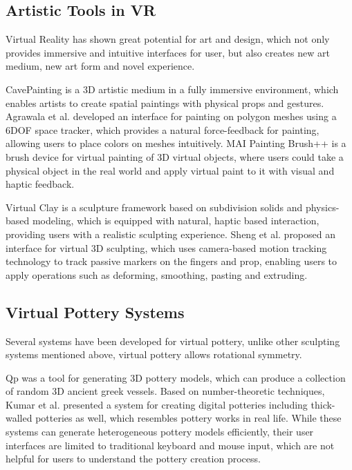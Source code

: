 \subsection{Artistic Tools in VR}
\label{sec:2.2}
Virtual Reality has shown great potential for art and design, which not only provides immersive and intuitive interfaces for user, but also creates new art medium, new art form and novel experience\cite{laviola20113d}.

CavePainting \cite{keefe2001cavepainting} is a 3D artistic medium in a fully immersive environment, which enables artists to create spatial paintings with physical props and gestures. Agrawala et al.\cite{agrawala19953d} developed an interface for painting on polygon meshes using a 6DOF space tracker, which provides a natural force-feedback for painting, allowing users to place colors on meshes intuitively. MAI Painting Brush++ \cite{otsuki2017brush} is a brush device for virtual painting of 3D virtual objects, where users could take a physical object in the real world and apply virtual paint to it with visual and haptic feedback.

Virtual Clay \cite{mcdonnell2001virtual} is a sculpture framework based on subdivision solids and physics-based modeling, which is equipped with natural, haptic based interaction, providing users with a realistic sculpting experience. Sheng et al. \cite{sheng2006interface} proposed an interface for virtual 3D sculpting, which uses camera-based motion tracking technology to track passive markers on the fingers and prop, enabling users to apply operations such as deforming, smoothing, pasting and extruding.

\subsection{Virtual Pottery Systems}
\label{sec:2.3}


Several systems have been developed for virtual pottery, unlike other sculpting systems mentioned above, virtual pottery allows rotational symmetry.

Qp \cite{koutsoudis2009qp} was a tool for generating 3D pottery models, which can produce a collection of random 3D ancient greek vessels.
Based on number-theoretic techniques, Kumar et al. \cite{kumar2011wheel} presented a system for creating digital potteries including thick-walled potteries as well, which resembles pottery works in real life.
While these systems can generate heterogeneous pottery models efficiently, their user interfaces are limited to traditional keyboard and mouse input, which are not helpful for users to understand the pottery creation process.

